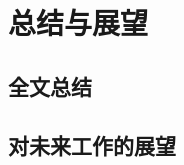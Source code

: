 
\renewcommand{\baselinestretch}{1.5}
\fontsize{12pt}{13pt}\selectfont

\chapter{总结与展望} \label{conclusion}


\section{全文总结}


\section{对未来工作的展望}


